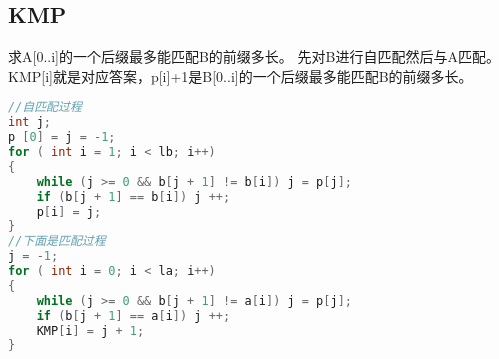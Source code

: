 \subsection{KMP}
    求A[0..i]的一个后缀最多能匹配B的前缀多长。
    先对B进行自匹配然后与A匹配。
    KMP[i]就是对应答案，p[i]+1是B[0..i]的一个后缀最多能匹配B的前缀多长。
    \begin{lstlisting}[language=c++]
//自匹配过程
int j;
p [0] = j = -1;
for ( int i = 1; i < lb; i++)
{
    while (j >= 0 && b[j + 1] != b[i]) j = p[j];
    if (b[j + 1] == b[i]) j ++;
    p[i] = j;
}
//下面是匹配过程
j = -1;
for ( int i = 0; i < la; i++)
{
    while (j >= 0 && b[j + 1] != a[i]) j = p[j];
    if (b[j + 1] == a[i]) j ++;
    KMP[i] = j + 1;
}
    \end{lstlisting} 